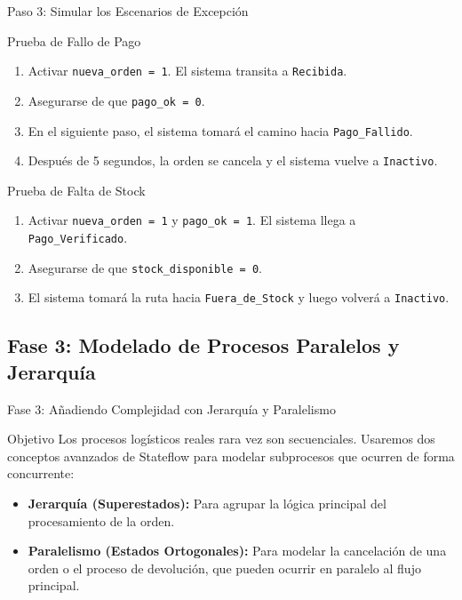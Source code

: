 \documentclass[aspectratio=169,xcolor=dvipsnames]{beamer}
\begin{document}
\begin{frame}{Paso 3: Simular los Escenarios de Excepción}
    \begin{block}{Prueba de Fallo de Pago}
        \begin{enumerate}
            \item Activar \texttt{nueva\_orden = 1}. El sistema transita a \texttt{Recibida}.
            \item Asegurarse de que \texttt{pago\_ok = 0}.
            \item En el siguiente paso, el sistema tomará el camino hacia \texttt{Pago\_Fallido}.
            \item Después de 5 segundos, la orden se cancela y el sistema vuelve a \texttt{Inactivo}.
        \end{enumerate}
    \end{block}
    
    \begin{alertblock}{Prueba de Falta de Stock}
        \begin{enumerate}
            \item Activar \texttt{nueva\_orden = 1} y \texttt{pago\_ok = 1}. El sistema llega a \texttt{Pago\_Verificado}.
            \item Asegurarse de que \texttt{stock\_disponible = 0}.
            \item El sistema tomará la ruta hacia \texttt{Fuera\_de\_Stock} y luego volverá a \texttt{Inactivo}.
        \end{enumerate}
    \end{alertblock}
\end{frame}

\subsection{Fase 3: Modelado de Procesos Paralelos y Jerarquía}

\begin{frame}{Fase 3: Añadiendo Complejidad con Jerarquía y Paralelismo}

    \begin{block}{Objetivo}
    Los procesos logísticos reales rara vez son secuenciales. Usaremos dos conceptos avanzados de Stateflow para modelar subprocesos que ocurren de forma concurrente:
        \begin{itemize}
            \item \textbf{Jerarquía (Superestados):} Para agrupar la lógica principal del procesamiento de la orden.
            \item \textbf{Paralelismo (Estados Ortogonales):} Para modelar la cancelación de una orden o el proceso de devolución, que pueden ocurrir en paralelo al flujo principal.
        \end{itemize}
    \end{block}
\end{frame}
\end{document}
